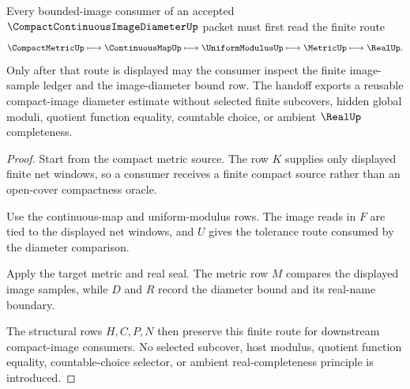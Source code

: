 \begin{theorem}
\label{thm:compact-continuous-image-diameter-uniform-bound}
Every bounded-image consumer of an accepted $\CompactContinuousImageDiameterUp$ packet must first read the finite route
$$
\CompactMetricUp \longmapsto \ContinuousMapUp \longmapsto \UniformModulusUp \longmapsto \MetricUp \longmapsto \RealUp .
$$
Only after that route is displayed may the consumer inspect the finite image-sample ledger and the image-diameter bound row. The handoff exports a reusable compact-image diameter estimate without selected finite subcovers, hidden global moduli, quotient function equality, countable choice, or ambient $\RealUp$ completeness.
\end{theorem}
\begin{proof}
Start from the compact metric source. The row $K$ supplies only displayed finite net windows, so a consumer receives a finite compact source rather than an open-cover compactness oracle.

Use the continuous-map and uniform-modulus rows. The image reads in $F$ are tied to the displayed net windows, and $U$ gives the tolerance route consumed by the diameter comparison.

Apply the target metric and real seal. The metric row $M$ compares the displayed image samples, while $D$ and $R$ record the diameter bound and its real-name boundary.

The structural rows $H,C,P,N$ then preserve this finite route for downstream compact-image consumers. No selected subcover, host modulus, quotient function equality, countable-choice selector, or ambient real-completeness principle is introduced.
\end{proof}



